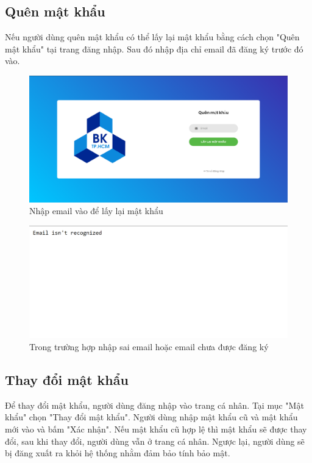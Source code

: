 \documentclass[a4paper]{article}
\begin{document}
	\subsection{Quên mật khẩu}
	Nếu người dùng quên mật khẩu có thể lấy lại mật khẩu bằng cách chọn "Quên mật khẩu" tại trang đăng nhập. Sau đó nhập địa chỉ email đã đăng ký trước đó vào.\linebreak
	
	\begin{figure}[H]
		\centering
		\includegraphics[scale=0.36]{forget_password.png}
		\caption{Nhập email vào để lấy lại mật khẩu}
		\label{F:forget_password}
	\end{figure}
	
	\begin{figure}[H]
		\centering
		\includegraphics[scale=0.8]{email_not_reconize.png}
		\caption{Trong trường hợp nhập sai email hoặc email chưa được đăng ký}
		\label{F:email_not_reconize}
	\end{figure}
	
	\subsection{Thay đổi mật khẩu}
	Để thay đổi mật khẩu, người dùng đăng nhập vào trang cá nhân. Tại mục "Mật khẩu" chọn "Thay đổi mật khẩu".\linebreak
	Người dùng nhập mật khẩu cũ và mật khẩu mới vào và bấm "Xác nhận". Nếu mật khẩu cũ hợp lệ thì mật khẩu sẽ được thay đổi, sau khi thay đổi, người dùng vẫn ở trang cá nhân. Ngược lại, người dùng sẽ bị đăng xuất ra khỏi hệ thống nhằm đảm bảo tính bảo mật.
	
\end{document}
